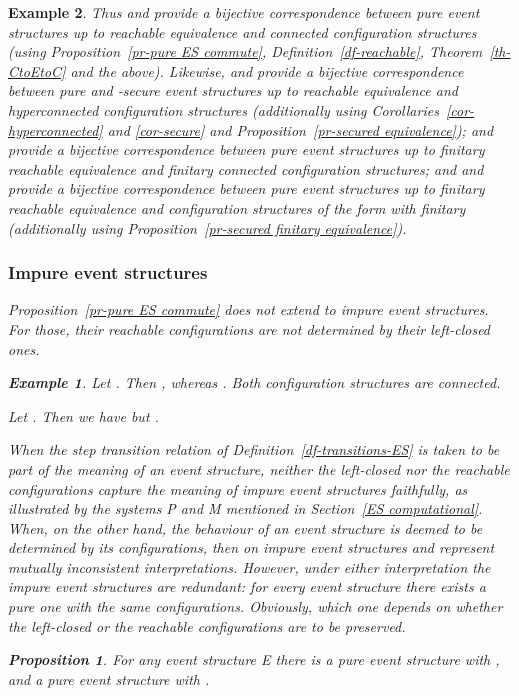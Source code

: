 \documentclass[twocolumn]{article}
\newtheorem{prop}{Proposition}[section]
\newtheorem{exam}{Example}
\newenvironment{proposition}[1]{\begin{prop} \rm \label{pr-#1} }{\end{prop}}
\newenvironment{example}[1]{\begin{exam} \rm \label{ex-#1} }{\end{exam}}
\newcommand{\df}[1]{Definition~\ref{df-#1}}
\newcommand{\thm}[1]{Theorem~\ref{th-#1}}
\newcommand{\pr}[1]{Proposition~\ref{pr-#1}}
\begin{document}
\begin{example}{causality}
Thus  and  provide a bijective correspondence between pure
event structures up to reachable equivalence and connected
configuration structures (using \pr{pure ES commute}, \df{reachable},
\thm{CtoEtoC} and the above).  Likewise,  and  provide a
bijective correspondence between pure and -secure event
structures up to reachable equivalence and hyperconnected configuration
structures (additionally using Corollaries~\ref{cor-hyperconnected}
and \ref{cor-secure} and \pr{secured equivalence});
 and  provide a bijective correspondence between pure
event structures up to finitary reachable equivalence and finitary
connected configuration structures; and  and  provide a
bijective correspondence between pure event structures up to finitary
reachable equivalence and configuration structures of the form
 with  finitary (additionally using \pr{secured
finitary equivalence}).

\subsubsection*{Impure event structures}

\pr{pure ES commute} does not extend to impure event structures. For those,
their reachable configurations are not determined by their left-closed ones.

\begin{example}{impure}
Let .
Then ,
whereas .
Both configuration structures are connected.

Let .
Then we have  but .
\end{example}
When the step transition relation of \df{transitions-ES} is taken to
be part of the meaning of an event structure, neither the left-closed
nor the reachable configurations capture the meaning of impure event
structures faithfully, as illustrated by the systems P and M mentioned
in Section~\ref{ES computational}. When, on the other hand, the
behaviour of an event structure is deemed to be determined by its
configurations, then on impure event structures  and 
represent mutually inconsistent interpretations.
However, under either interpretation the impure event structures are
redundant: for every event structure there exists a pure one with the
same configurations.  Obviously, which one depends on whether the
left-closed or the reachable configurations are to be preserved.

\begin{proposition}{purification}
For any event structure E there is
a pure event structure  with ,
and a pure event structure  with .
\end{proposition}


\end{example}
\end{document}
